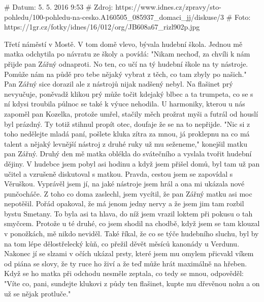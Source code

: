 # Datum: 5. 5. 2016 9:53
# Zdroj: https://www.idnes.cz/zpravy/sto-pohledu/100-pohledu-na-cesko.A160505_085937_domaci_jj/diskuse/3
# Foto: https://1gr.cz/fotky/idnes/16/012/org/JB608a67_rizl902p.jpg

Třetí náměstí v Mostě. V tom domě vlevo, bývala hudební škola. Jednou
mě matka odchytila po návratu ze školy a povídá: "Nikam nechoď, za
chvíli k nám přijde pan Zářný odnaproti. No ten, co učí na tý hudební
škole na ty nástroje. Pomůže nám na půdě pro tebe nějaký vybrat z
těch, co tam zbyly po našich." Pan Zářný sice dorazil ale z nástrojů
nijak nadšený nebyl. Na flašinet prý nevyučuje, poněvadž klikou prý
může točit kdejaký blbec a ta trumpeta, co se s ní kdysi troubila
půlnoc se také k výuce nehodila. U harmoniky, kterou u nás zapoměl pan
Kozelka, protože umřel, stačily měch prožrat myši a futrál od houslí
byl prázdný. Ty totiž stihnul propít otec, doufaje že se na to
nepřijde. "Nic si z toho nedělejte mladá paní, pošlete kluka zítra za
mnou, já proklepnu na co má talent a nějaký levnější nástroj z druhé
ruky už mu seženeme," konejšil matku pan Zářný. Druhý den mě matka
oblékla do svátečního a vyslala tvořit hudební dějiny. V hudebce jsem
pobyl asi hodinu a když jsem přišel domů, byl tam už pan učitel a
vzrušeně diskutoval s matkou. Pravda, cestou jsem se zapovídal s
Věruškou. Vyprávěl jsem jí, na jaké nástroje jsem hrál a ona mi
ukázala nové punčocháče. Z toho co doma zaslechl, jsem vycítil, že pan
Zářný matku asi moc nepotěšil. Pořád opakoval, že má jenom jedny nervy
a že jsem jim tam rozbil bystu Smetany. To byla asi ta hlava, do níž
jsem vrazil loktem při pokusu o tah smyčcem. Protože u té druhé, co
jsem shodil na chodbě, když jsem se tam klouzal v ponožkách, mě nikdo
neviděl. Také říkal, že co se týče hudebního sluchu, byl by na tom
lépe dělostřelecký kůň, co přežil děvět měsíců kanonády u Verdunu.
Nakonec jí se slzami v očích ukázal prsty, které jsem mu omylem
přicvakl víkem od piána se slovy, že ty ruce ho živí a že teď může
hrát maximálně na hřeben. Když se ho matka při odchodu nesměle
zeptala, co tedy se mnou, odpověděl: "Víte co, pani, sundejte klukovi
z půdy ten flašinet, kupte mu dřevěnou nohu a on už se nějak
protluče."
